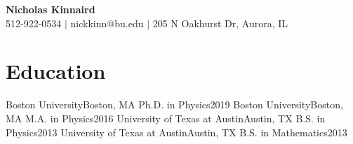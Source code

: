 \newcommand{\shorterSection}[1]{\vspace{-10pt}\section{#1}}



\begin{center}
  \textbf{{\huge Nicholas Kinnaird}} \\
  \small 512-922-0534 $\vert$ nickkinn@bu.edu $\vert$ 205 N Oakhurst Dr, Aurora, IL
\end{center}

\shorterSection{Education}
  \resumeSubHeadingListStart
    \resumeSubheading
      {Boston University}{Boston, MA}
      {Ph.D. in Physics}{2019}{
    }
    \resumeSubheading
      {Boston University}{Boston, MA}
      {M.A. in Physics}{2016}{
    }
    \resumeSubheading
      {University of Texas at Austin}{Austin, TX}
      {B.S. in Physics}{2013}
    \resumeSubheading
      {University of Texas at Austin}{Austin, TX}
      {B.S. in Mathematics}{2013}{}
  \resumeSubHeadingListEnd



